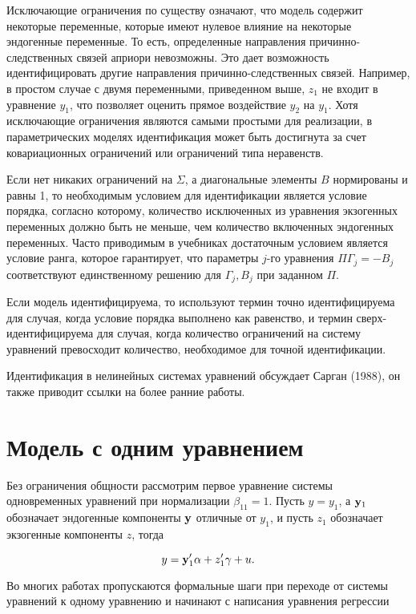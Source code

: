 	
Исключающие ограничения по существу означают, что модель содержит некоторые переменные, которые имеют нулевое влияние на некоторые эндогенные переменные. То есть, определенные направления причинно-следственных связей априори невозможны. Это дает возможность идентифицировать другие направления причинно-следственных связей. Например, в простом случае с двумя переменными, приведенном выше, $z_{1}$ не входит в уравнение $y_{1}$, что позволяет оценить  прямое воздействие $y_{2}$ на $y_{1}$. Хотя исключающие ограничения являются самыми простыми для реализации, в параметрических моделях идентификация может быть достигнута за счет ковариационных ограничений или ограничений типа неравенств.
	
	
Если нет никаких ограничений на $\Sigma$, а диагональные элементы $B$ нормированы и равны 1, то необходимым условием для идентификации является условие порядка, согласно которому, количество исключенных из уравнения экзогенных переменных должно быть не меньше, чем  количество включенных эндогенных переменных. Часто приводимым в учебниках достаточным условием является условие ранга, которое гарантирует, что  параметры $j$-го уравнения $\Pi \Gamma_{j}=-B_{j}$ соответствуют единственному решению для $\Gamma_{j},B_{j}$ при заданном $\Pi$.

Если модель идентифицируема, то используют термин точно идентифицируема для случая, когда условие порядка выполнено как равенство, и  термин сверх-идентифицируема для случая, когда количество ограничений на систему уравнений превосходит количество, необходимое для точной идентификации.

Идентификация в нелинейных системах уравнений обсуждает Сарган (1988), он также приводит ссылки на более ранние работы.
	
\section{Модель с одним уравнением}


Без ограничения общности рассмотрим первое уравнение системы одновременных уравнений при нормализации $\beta_{11}=1$. Пусть $y=y_{1}$, а $\mathbf{y}_{1}$ обозначает эндогенные компоненты $\mathbf{y}$ отличные от $y_{1}$, и пусть $z_{1}$ обозначает экзогенные компоненты $z$, тогда


\begin{equation}
y=\mathbf{y}'_{1}\alpha+z'_{1}\gamma+u.
\end{equation}

Во многих работах пропускаются формальные шаги при переходе от системы уравнений к одному уравнению и начинают с написания уравнения регрессии

